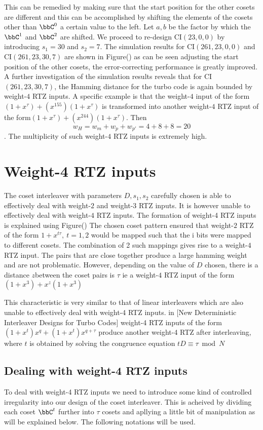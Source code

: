 \documentclass[11pt, oneside, dvipdfmx]{book}
\begin{document}
This can be remedied by making sure that the start position for the other cosets are different and this can be accomplished by shifting the elements of the cosets other than $\bbC^0$ a certain value to the left. Let $a,b$ be the factor by which the $\bbC^1$ and $\bbC^2$ are shifted.  We proceed to re-design  CI$(23,0,0)$  by introducing $s_1=30$ and $s_2=7$.
The simulation results for CI$(261,23,0,0)$ and CI$(261,23,30,7)$ are shown in Figure() as can be seen adjusting the start position of the other cosets, the error-correcting performance is greatly improved. A further investigation of the simulation results reveals that for CI$(261,23,30,7)$, the Hamming distance for the turbo code is again bounded by weight-$4$ RTZ inputs. A specific example is that the weight-$4$ input of the form $(1+x^{\tau})+(x^{155})(1+x^{\tau})$ is transformed into another weight-$4$ RTZ input of the form$ (1+x^{\tau})+(x^{244})(1+x^{\tau})$. Then $$w_H=w_m+w_p+w_{p'}=4+8+8=20$$. The multiplicity of such weight-$4$ RTZ inputs is extremely high. 

\section{Weight-4 RTZ inputs}
The coset interleaver with parameters $D,s_1,s_2$ carefully chosen is able to effectively deal with weight-$2$ and weight-$3$ RTZ inputs. It is however unable to effectively deal with weight-$4$ RTZ inputs. The formation of weight-4 RTZ inputs is explained using Figure()
The chosen coset pattern ensured that weight-$2$ RTZ of the form $1+x^{t\tau},~t=1,2$ would be mapped such that the i bits were mapped to different cosets. The combination of 2 such mappings gives rise to a weight-$4$ RTZ input. The pairs that are close together produce a large hamming weight and are not problematic. However, depending on the value of $D$ chosen, there is a distance $z$between the coset pairs is $\tau$ ie a weight-$4$ RTZ input of the form $(1+x^3) +x^z(1+x^3)$

This characteristic is very similar to that of linear interleavers which are also unable to effectively deal with weight-4 RTZ inputs. in [New Deterministic Interleaver Designs for
Turbo Codes] weight-4 RTZ inputs of the form $(1+x^t)x^q + (1+x^t)x^{q+\tau}$ produce another weight-4 RTZ after interleaving, where $t$ is obtained by solving the congruence equation $tD\equiv \tau \bmod N$

\subsection{Dealing with weight-4 RTZ inputs}
To deal with weight-4 RTZ inputs we need to introduce some kind of controlled irregularity into our design of the coset interleaver. This is acheived by dividing each coset $\bbC^t$ further into $\tau $ cosets and apllying a little bit of manipulation as will be explained below. The following notations will be used.
\end{document}
